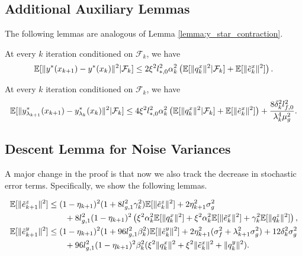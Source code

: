 \subsection{Additional Auxiliary Lemmas}
The following lemmas are analogous of Lemma \ref{lemma:y_star_contraction}. 

\begin{lemma}
    \label{lemma:y_star_contraction_momentum}
    At every $k$ iteration conditioned on $\mathcal{F}_k$, we have
    \begin{align*}
        \mathbb{E}[\|y^*(x_{k+1}) - y^*(x_k)\|^2| \mathcal{F}_k] \le 2\xi^2 l_{*,0}^2 \alpha_k^2 \left( \mathbb{E}[\|q_k^x\|^2 | \mathcal{F}_k] + \mathbb{E}[\|\tilde{e}_k^x\|^2] \right). 
    \end{align*}
\end{lemma}




\begin{lemma}
    \label{lemma:y_star_lambda_contraction_momentum}
    At every $k$ iteration conditioned on $\mathcal{F}_k$, we have
    \begin{align*}
        \mathbb{E}[\|y_{\lambda_{k+1}}^*(x_{k+1}) - y_{\lambda_k}^*(x_k)\|^2| \mathcal{F}_k] \le 4\xi^2 l_{*,0}^2 \alpha_k^2 \left( \mathbb{E}[\|q_k^x\|^2 | \mathcal{F}_k] + \mathbb{E}[\|\tilde{e}_k^x\|^2] \right) + \frac{8\delta_k^2 l_{f,0}^2}{\lambda_k^4 \mu_g^2}. 
    \end{align*}
\end{lemma}




\subsection{Descent Lemma for Noise Variances}
A major change in the proof is that now we also track the decrease in stochastic error terms. Specifically, we show the following lemmas.
\begin{lemma}
    \label{lemma:descent_stochastic_noise_yz}
    \begin{align*}
        \mathbb{E}[\| \tilde{e}_{k+1}^z\|^2] &\le (1 - \eta_{k+1})^2 (1 + 8l_{g,1}^2 \gamma_k^2) \mathbb{E}[\|\tilde{e}_k^z\|^2] + 2 \eta_{k+1}^2 \sigma_g^2 \\
        &\qquad + 8 l_{g,1}^2 (1-\eta_{k+1})^2 \left( \xi^2 \alpha_k^2 \mathbb{E}[\|q_k^x\|^2] + \xi^2 \alpha_k^2 \mathbb{E}[\|\tilde{e}_k^x\|^2] + \gamma_k^2 \mathbb{E}[\|q_k^z\|^2] \right), \\
        \mathbb{E}[\| \tilde{e}_{k+1}^y\|^2] &\le (1-\eta_{k+1})^2 (1 + 96 l_{g,1}^2 \beta_k^2 ) \mathbb{E}[\| \tilde{e}_{k}^y\|^2 ] + 2 \eta_{k+1}^2 (\sigma_f^2 + \lambda_{k+1}^2 \sigma_g^2) + 12 \delta_k^2 \sigma_g^2 \\
    &\qquad + 96 l_{g,1}^2 (1-\eta_{k+1})^2 \beta_k^2 (\xi^2 \|q_k^x\|^2 + \xi^2 \|\tilde{e}_k^x\|^2 + \|q_k^y\|^2).
    \end{align*}
\end{lemma}


